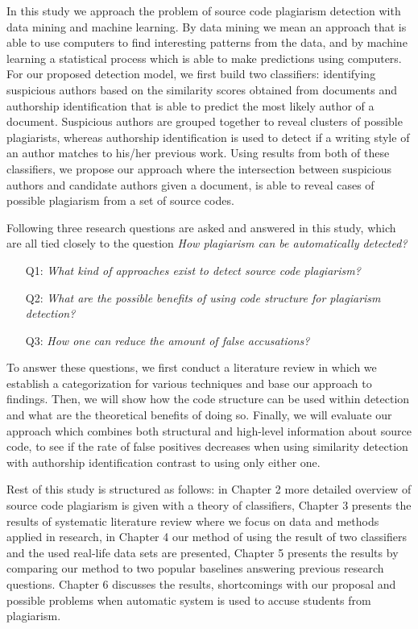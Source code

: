 \documentclass[english, grading]{tktltiki2}
\theoremstyle{definition}
\theoremstyle{remark}
\numberwithin{equation}{section} %
\begin{document}
In this study we approach the problem of source code plagiarism detection with data mining and machine learning. By data mining we mean an approach that is able to use computers to find interesting patterns from the data, and by machine learning a statistical process which is able to make predictions using computers. For our proposed detection model, we first build two classifiers: identifying suspicious authors based on the similarity scores obtained from documents and authorship identification that is able to predict the most likely author of a document. Suspicious authors are grouped together to reveal clusters of possible plagiarists, whereas authorship identification is used to detect if a writing style of an author matches to his/her previous work. Using results from both of these classifiers, we propose our approach where the intersection between suspicious authors and candidate authors given a document, is able to reveal cases of possible plagiarism from a set of source codes.

Following three research questions are asked and answered in this study, which are all tied closely to the question \emph{How plagiarism can be automatically detected?}

\begin{itemize}
    \item[Q1:] \emph{What kind of approaches exist to detect source code plagiarism?}
    \item[Q2:] \emph{What are the possible benefits of using code structure for plagiarism detection?}
    \item[Q3:] \emph{How one can reduce the amount of false accusations?}
\end{itemize}

\noindent
To answer these questions, we first conduct a literature review in which we establish a categorization for various techniques and base our approach to findings. Then, we will show how the code structure can be used within detection and what are the theoretical benefits of doing so. Finally, we will evaluate our approach which combines both structural and high-level information about source code, to see if the rate of false positives decreases when using similarity detection with authorship identification contrast to using only either one.

Rest of this study is structured as follows: in Chapter 2 more detailed overview of source code plagiarism is given with a theory of classifiers, Chapter 3 presents the results of systematic literature review where we focus on data and methods applied in research, in Chapter 4 our method of using the result of two classifiers and the used real-life data sets are presented, Chapter 5 presents the results by comparing our method to two popular baselines answering previous research questions. Chapter 6 discusses the results, shortcomings with our proposal and possible problems when automatic system is used to accuse students from plagiarism. 
\end{document}
